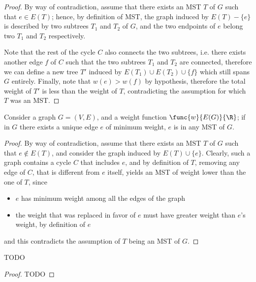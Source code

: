 \documentclass[a4paper, 12pt]{report}
\begin{document}
    \begin{proof}
        By way of contradiction, assume that there exists an MST $T$ of $G$ such that $e \in E(T)$; hence, by definition of MST, the graph induced by $E(T) - \{e\}$ is described by two subtrees $T_1$ and $T_2$ of $G$, and the two endpoints of $e$ belong two $T_1$ and $T_2$ respectively.

        Note that the rest of the cycle $C$ also connects the two subtrees, i.e. there exists another edge $f$ of $C$ such that the two subtrees $T_1$ and $T_2$ are connected, therefore we can define a new tree $T'$ induced by $E(T_1) \cup E(T_2) \cup \{f\}$ which still spans $G$ entirely. Finally, note that $w(e) > w(f)$ by hypothesis, therefore the total weight of $T'$ is less than the weight of $T$, contradicting the assumption for which $T$ was an MST.
    \end{proof}

    \begin{framedlem}{}
        Consider a graph $G = (V, E)$, and a weight function $\func{w}{E(G)}{\R}$; if in $G$ there exists a unique edge $e$ of minimum weight, $e$ is in any MST of $G$.
    \end{framedlem}

    \begin{proof}
        By way of contradiction, assume that there exists an MST $T$ of $G$ such that $e \notin E(T)$, and consider the graph induced by $E(T) \cup \{e\}$. Clearly, such a graph contains a cycle $C$ that includes $e$, and by definition of $T$, removing any edge of $C$, that is different from $e$ itself, yields an MST of weight lower than the one of $T$, since

        \begin{itemize}
            \item $e$ has minimum weight among all the edges of the graph
            \item the weight that was replaced in favor of $e$ must have greater weight than $e$'s weight, by definition of $e$
        \end{itemize}

        and this contradicts the assumption of $T$ being an MST of $G$.
    \end{proof}
    
    \begin{framedlem}{}
        TODO
    \end{framedlem}

    \begin{proof}
        TODO 
    \end{proof}
\end{document}
